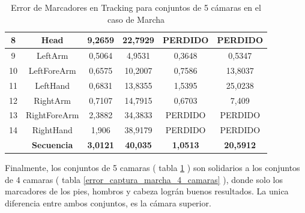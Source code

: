 \begin{table}[h]
\begin{tabular}{c|c|c|c|c|c|}
\multicolumn{1}{|c|}{8} & Head & 9,2659 & 22,7929 & PERDIDO & PERDIDO \\ \hline
\multicolumn{1}{|c|}{9} & LeftArm & 0,5064 & 4,9531 & 0,3648 & 0,5347 \\ \hline
\multicolumn{1}{|c|}{10} & LeftForeArm & 0,6575 & 10,2007 & 0,7586 & 13,8037 \\ \hline
\multicolumn{1}{|c|}{11} & LeftHand & 0,6831 & 13,8355 & 1,5395 & 25,0238 \\ \hline
\multicolumn{1}{|c|}{12} & RightArm & 0,7107 & 14,7915 & 0,6703 & 7,409 \\ \hline
\multicolumn{1}{|c|}{13} & RightForeArm & 2,3882 & 34,3833 & PERDIDO & PERDIDO \\ \hline
\multicolumn{1}{|c|}{14} & RightHand & 1,906 & 38,9179 & PERDIDO & PERDIDO \\ \hline
 & \textbf{Secuencia} & \textbf{3,0121} & \textbf{40,035} & \textbf{1,0513} & \textbf{20,5912} \\ \cline{2-6} 
\end{tabular}
\label{error_captura_marcha_5_camaras}
\caption{Error de Marcadores en Tracking para conjuntos de 5 cámaras en el caso de Marcha}
\end{table}

Finalmente, los conjuntos de 5 camaras ( tabla \ref{error_captura_marcha_5_camaras} ) son solidarios a los conjuntos de 4 camaras ( tabla \ref{error_captura_marcha_4_camaras} ), donde solo los marcadores de los pies, hombros y cabeza lográn buenos resultados. La unica diferencia entre ambos conjuntos, es la cámara superior.

